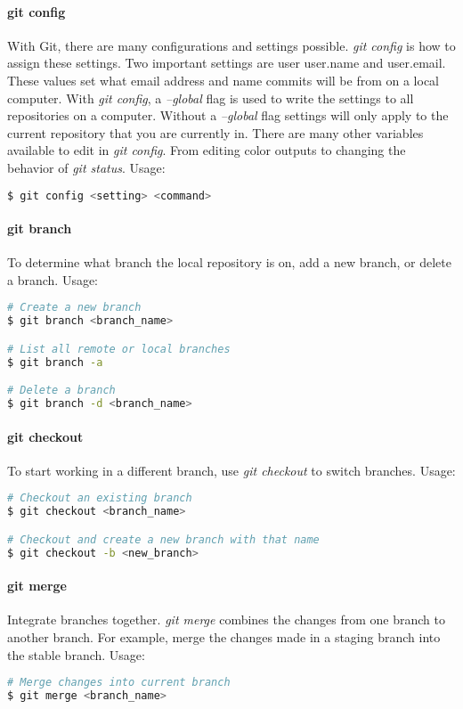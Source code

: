 \documentclass[a4paper]{report}
\begin{document}
\paragraph{git config}
With Git, there are many configurations and settings possible. \emph{git config} is how to assign these settings. Two important settings are user user.name and user.email. These values set what email address and name commits will be from on a local computer. With \emph{git config}, a \emph{--global} flag is used to write the settings to all repositories on a computer. Without a \emph{--global} flag settings will only apply to the current repository that you are currently in.
There are many other variables available to edit in \emph{git config}. From editing color outputs to changing the behavior of \emph{git status}. 
Usage:
\begin{lstlisting}[language=bash]
$ git config <setting> <command>
\end{lstlisting}

\paragraph{git branch}
To determine what branch the local repository is on, add a new branch, or delete a branch.
Usage:
\begin{lstlisting}[language=bash]
# Create a new branch
$ git branch <branch_name>

# List all remote or local branches
$ git branch -a

# Delete a branch
$ git branch -d <branch_name>
\end{lstlisting}


\paragraph{git checkout}
To start working in a different branch, use \emph{git checkout} to switch branches.
Usage:
\begin{lstlisting}[language=bash]
# Checkout an existing branch
$ git checkout <branch_name>

# Checkout and create a new branch with that name
$ git checkout -b <new_branch>
\end{lstlisting}

\paragraph{git merge}
Integrate branches together. \emph{git merge} combines the changes from one branch to another branch. For example, merge the changes made in a staging branch into the stable branch.
Usage:
\begin{lstlisting}[language=bash]
# Merge changes into current branch
$ git merge <branch_name>
\end{lstlisting}
\end{document}
